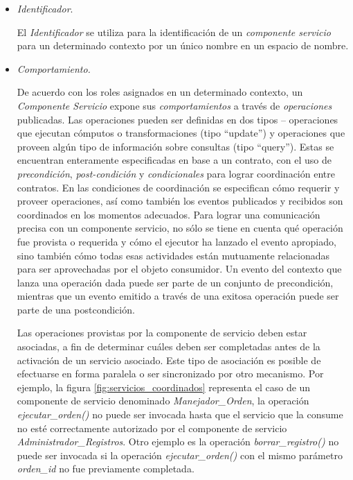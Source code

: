 \begin{itemize}

\item \textit{Identificador}.

El \textit{Identificador} se utiliza para la identificación de un \textit{componente servicio} para un determinado contexto por un único nombre en un espacio de nombre.

\item \textit{Comportamiento.}

De acuerdo con los roles asignados en un determinado contexto, un \textit{Componente Servicio} expone sus \textit{comportamientos} a través de \textit{operaciones} publicadas. Las operaciones pueden ser definidas en dos tipos – operaciones que ejecutan cómputos o transformaciones (tipo “update”) y operaciones que proveen algún tipo de información sobre consultas (tipo “query”). Estas se encuentran enteramente especificadas en base
a un contrato, con el uso de \textit{precondición}, \textit{post-condición} y \textit{condicionales} para lograr coordinación entre contratos. En las condiciones de coordinación se especifican cómo requerir y proveer operaciones, así como también los eventos publicados y recibidos son coordinados en los momentos adecuados. Para lograr una comunicación precisa con un componente servicio, no sólo se tiene en cuenta qué operación fue provista o requerida y cómo el ejecutor ha lanzado el evento apropiado, sino también cómo todas esas actividades están mutuamente relacionadas para ser aprovechadas por el objeto consumidor. Un evento del contexto que lanza una operación dada puede ser parte de un conjunto de precondición, mientras que un evento emitido a través de una exitosa operación puede ser parte de una postcondición.


Las operaciones provistas por la componente de servicio deben estar asociadas, a fin de determinar cuáles deben ser completadas antes de la activación de un servicio asociado. Este tipo de asociación es posible de efectuarse en forma paralela o ser sincronizado por otro mecanismo. Por ejemplo, la figura \ref{fig:servicios_coordinados} representa el caso de un componente de servicio denominado \textit{Manejador\_Orden}, la operación \textit{ejecutar\_orden()} no puede ser invocada hasta que el servicio que la consume no esté correctamente autorizado por el componente de servicio \textit{Administrador\_Registros}. Otro ejemplo es la operación \textit{borrar\_registro()} no puede ser invocada si la operación \textit{ejecutar\_orden()} con el mismo parámetro \textit{orden\_id} no fue previamente completada.



\end{itemize}
